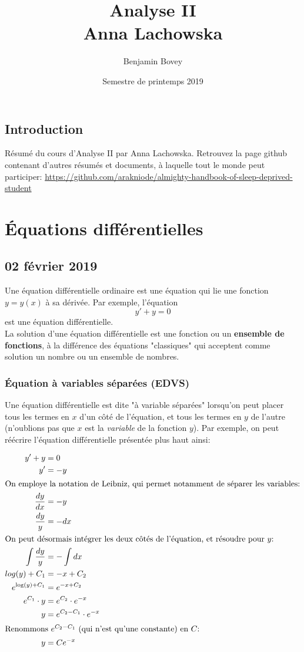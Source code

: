 \documentclass{report}
\title{Analyse II \\ Anna Lachowska}
\author{Benjamin Bovey}
\date{Semestre de printemps 2019}
\theoremstyle{plain}
\theoremstyle{definition}
\theoremstyle{remark}
\begin{document}
\section*{Introduction}
Résumé du cours d'Analyse II par Anna Lachowska. Retrouvez la page github contenant d'autres résumés et documents, à laquelle tout le monde peut participer: \url{https://github.com/arakniode/almighty-handbook-of-sleep-deprived-student}

\chapter{Équations différentielles}

\section{02 février 2019}
Une équation différentielle ordinaire est une équation qui lie une fonction $y = y(x)$ à sa dérivée. Par exemple, l'équation
\begin{equation}
	y' + y = 0
\end{equation}
est une équation différentielle. 
\\
La solution d'une équation différentielle est une fonction ou un \textbf{ensemble de fonctions}, à la différence des équations "classiques" qui acceptent comme solution un nombre ou un ensemble de nombres. 

\subsection{Équation à variables séparées (EDVS)}
Une équation différentielle est dite "à variable séparées" lorsqu'on peut placer tous les termes en $x$ d'un côté de l'équation, et tous les termes en $y$ de l'autre (n'oublions pas que $x$ est la \emph{variable} de la fonction $y$). Par exemple, on peut réécrire l'équation différentielle présentée plus haut ainsi:

\begin{align*}
	y' + y &= 0 \\
	y' &= -y \\
\intertext{On employe la notation de Leibniz, qui permet notamment de séparer les variables:}
	\dfrac{dy}{dx} &= -y \\
	\dfrac{dy}{y} &= -dx \\
\intertext{On peut désormais intégrer les deux côtés de l'équation, et résoudre pour $y$:}
	\int \dfrac{dy}{y} &= -\int dx \\
	log(y) + C_1 &= -x + C_2 \\
	e^{\log(y) + C_1} &= e^{-x + C_2} \\
	e^{C_1} \cdot y &= e^{C_2} \cdot e^{-x} \\
	y &= e^{C_2 - C_1} \cdot e^{-x} \\
\intertext{Renommons $e^{C_2 - C_1}$ (qui n'est qu'une constante) en $C$:}
	y &= Ce^{-x}
\end{align*}
\end{document}
